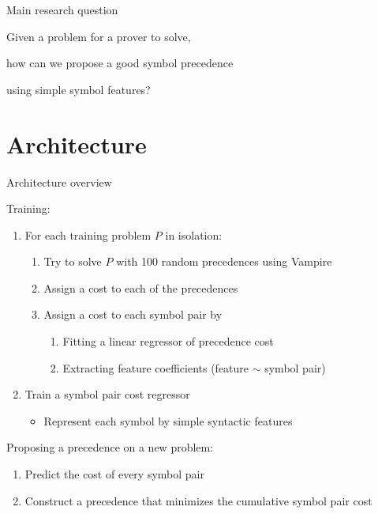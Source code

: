 \documentclass{beamer}
\begin{document}
\begin{frame}{Main research question}

\centering

Given a problem for a prover to solve,

how can we propose a good symbol precedence

using simple symbol features?

\end{frame}

\section{Architecture}

\begin{frame}{Architecture overview}

Training:
\begin{enumerate}
	\item For each training problem $P$ in isolation:
	\begin{enumerate}
		\item Try to solve $P$ with 100 random precedences using Vampire
		\item Assign a cost to each of the precedences%
		\item Assign a cost to each symbol pair by
		\begin{enumerate}
			\item Fitting a linear regressor of precedence cost
			\item Extracting feature coefficients (feature $\sim$ symbol pair)
		\end{enumerate}
	\end{enumerate}
	\item Train a symbol pair cost regressor
	\begin{itemize}
		\item Represent each symbol by simple syntactic features
	\end{itemize}
\end{enumerate}

\vspace{.5cm}

Proposing a precedence on a new problem:
\begin{enumerate}
	\item Predict the cost of every symbol pair
	\item Construct a precedence that minimizes the cumulative symbol pair cost
\end{enumerate}

\end{frame}
\end{document}
